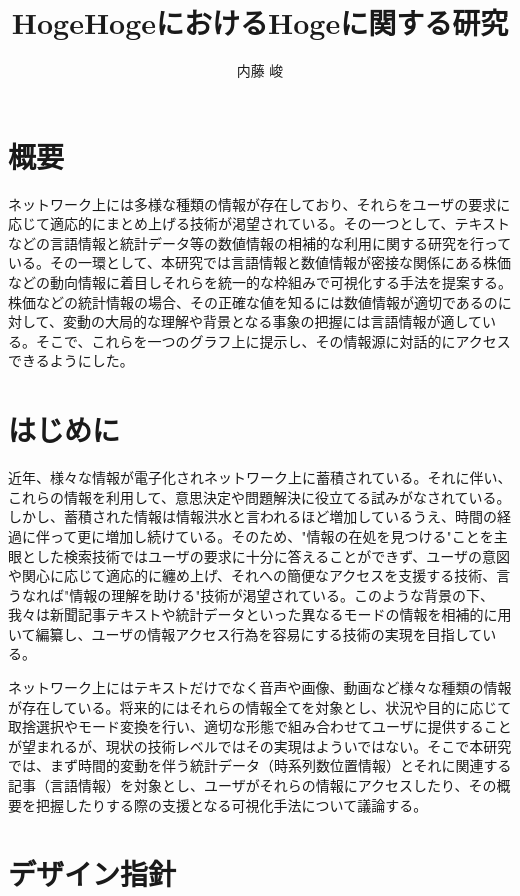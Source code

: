 \documentclass{matsushita-zemi}
\title{HogeHogeにおけるHogeに関する研究}
\author{内藤 峻}
\begin{document}
\maketitle

\section*{概要}
\label{abstract}
ネットワーク上には多様な種類の情報が存在しており、それらをユーザの要求に応じて適応的にまとめ上げる技術が渇望されている。その一つとして、テキストなどの言語情報と統計データ等の数値情報の相補的な利用に関する研究を行っている。その一環として、本研究では言語情報と数値情報が密接な関係にある株価などの動向情報に着目しそれらを統一的な枠組みで可視化する手法を提案する。株価などの統計情報の場合、その正確な値を知るには数値情報が適切であるのに対して、変動の大局的な理解や背景となる事象の把握には言語情報が適している。そこで、これらを一つのグラフ上に提示し、その情報源に対話的にアクセスできるようにした。

\section{はじめに}
\label{background} 
近年、様々な情報が電子化されネットワーク上に蓄積されている。それに伴い、これらの情報を利用して、意思決定や問題解決に役立てる試みがなされている。しかし、蓄積された情報は情報洪水と言われるほど増加しているうえ、時間の経過に伴って更に増加し続けている。そのため、"情報の在処を見つける"ことを主眼とした検索技術ではユーザの要求に十分に答えることができず、ユーザの意図や関心に応じて適応的に纏め上げ、それへの簡便なアクセスを支援する技術、言うなれば"情報の理解を助ける"技術が渇望されている\cite{Elucignage}。このような背景の下、我々は新聞記事テキストや統計データといった異なるモードの情報を相補的に用いて編纂し、ユーザの情報アクセス行為を容易にする技術の実現を目指している。

ネットワーク上にはテキストだけでなく音声や画像、動画など様々な種類の情報が存在している。将来的にはそれらの情報全てを対象とし、状況や目的に応じて取捨選択やモード変換を行い、適切な形態で組み合わせてユーザに提供することが望まれるが、現状の技術レベルではその実現はよういではない。そこで本研究では、まず時間的変動を伴う統計データ（時系列数位置情報）とそれに関連する記事（言語情報）を対象とし、ユーザがそれらの情報にアクセスしたり、その概要を把握したりする際の支援となる可視化手法について議論する\cite{Elucignage-jsai}。

\section{デザイン指針}
\end{document}
